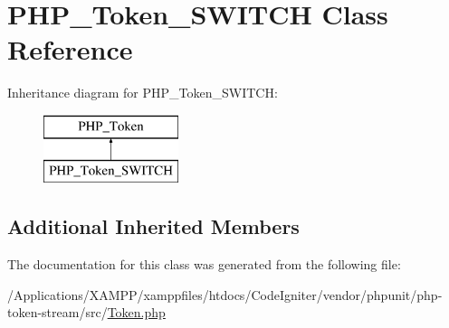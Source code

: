 \hypertarget{class_p_h_p___token___s_w_i_t_c_h}{}\section{P\+H\+P\+\_\+\+Token\+\_\+\+S\+W\+I\+T\+CH Class Reference}
\label{class_p_h_p___token___s_w_i_t_c_h}
Inheritance diagram for P\+H\+P\+\_\+\+Token\+\_\+\+S\+W\+I\+T\+CH\+:\begin{figure}[H]
\begin{center}
\leavevmode
\includegraphics[height=2.000000cm]{class_p_h_p___token___s_w_i_t_c_h}
\end{center}
\end{figure}
\subsection*{Additional Inherited Members}


The documentation for this class was generated from the following file\+:\begin{DoxyCompactItemize}
\item 
/\+Applications/\+X\+A\+M\+P\+P/xamppfiles/htdocs/\+Code\+Igniter/vendor/phpunit/php-\/token-\/stream/src/\mbox{\hyperlink{_token_8php}{Token.\+php}}\end{DoxyCompactItemize}

